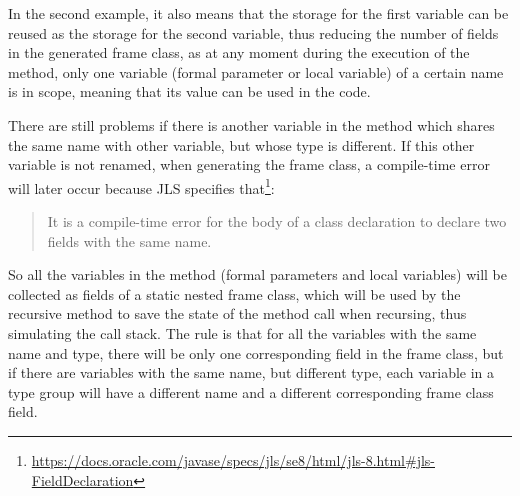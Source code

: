 
In the second example, it also means that the storage for the first  variable can be reused as the storage for
the second  variable, thus reducing the number of fields in the generated frame class, as at any moment during
the execution of the method, only one variable (formal parameter or local variable) of a certain name is in scope,
meaning that its value can be used in the code.

There are still problems if there is another variable in the method which shares the same name with other variable, but
whose type is different. If this other variable is not renamed, when generating the frame class, a compile-time error
will later occur because JLS specifies that\footnote{\url{https://docs.oracle.com/javase/specs/jls/se8/html/jls-8.html#jls-FieldDeclaration}}:
\begin{quote}
    It is a compile-time error for the body of a class declaration to declare two fields with the same name.
\end{quote}

So all the variables in the method (formal parameters and local variables) will be collected as fields of a static
nested frame class, which will be used by the recursive method to save the state of the method call when recursing, thus
simulating the call stack. The rule is that for all the variables with the same name and type, there will be only one
corresponding field in the frame class, but if there are variables with the same name, but different type, each variable
in a type group will have a different name and a different corresponding frame class field.